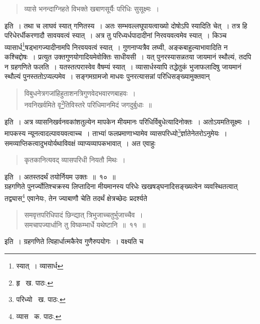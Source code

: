 \documentclass[11pt, openany]{book}
\begin{document}
\begin{quote}
{\qt व्यासे भनन्दाग्निहते विभक्ते खबाणसूर्यैः परिधिः सुसूक्ष्मः~।}
\end{quote}

\noindent इति~। तथा च लाघवं स्यात् गणितस्य~। अतः सम्भवल्लघूपायत्वाख्यो दोषोऽपि स्यादिति चेत्~। तत्र हि परिधेरर्धीकरणादौ सावयवत्वं स्यात्~। अत्र तु परिध्यर्धपादादीनां निरवयवत्वमेव स्यात्~। किञ्च व्यासार्ध\renewcommand{\thefootnote}{२}\footnote{स्यात्~। व्यासार्ध}षड्भागज्यादीनामपि निरवयवत्वं स्यात्~। गुणनाप्यत्रैव लघ्वी, अङ्कबाहुल्याभावादिति न कश्चिद्दोषः~। प्रत्युत उक्तगुणयोगादियमेवोक्तिः साधीयसी~। यत् पुनरस्यासन्नतया जायमानं स्थौल्यं, तदपि न ग्रहगणिते फलति~। यतस्तत्परास्वेव वैषम्यं स्यात्~। व्यासार्धस्यापि तद्धेतुकं भुजाफलादिषु जायमानं स्थौल्यं पुनस्ततोऽप्यल्पमेव~। सङ्गमग्रामजो माधवः पुनरत्यासन्नां परिधिसङ्ख्यामुक्तवान्\textendash 

\begin{quote}
{\qt विबुधनेत्रगजांहिहुताशनत्रिगुणवेदभवारणबाहवः~।\\
नवनिखर्वमिते वृ\renewcommand{\thefootnote}{३}\footnote{हृ \textendash\ ख. पाठः.}तिविस्तरे परिधिमानमिदं जगदुर्बुधाः~॥}
\end{quote}

\noindent इति~। अत्र व्यासनिखर्वनवकांशतुल्येन मापकेन मीयमानः परिधिर्विबुधेत्यादिनोक्तः~। अतोऽयमतिसूक्ष्मः~। मापकस्य न्यूनत्वादल्पावयवत्वाच्च~। ताभ्यां फलप्रमाणाभ्यामेव व्यासपरिध्यो\renewcommand{\thefootnote}{४}\footnote{परिध्यो \textendash\ ख. पाठः.}र्ज्ञातेनेतरोऽनुमेयः~। समव्याप्तिकत्वादुभयोर्यथाविवक्षं व्याप्यव्यापकभावात्~। अत एवाहुः\textendash 

\begin{quote}
{\qt कृतकानित्यवद् व्यासपरिधी नियतौ मिथः~।}
\end{quote}

\noindent इति~। अतस्तदर्थं तयोर्नियम उक्तः~॥~१०~॥\\

ग्रहगणिते पुनर्ज्योतिश्चक्रस्य लिप्तादिना मीयमानस्य परिधेः खखषड्घनादिसङ्ख्यत्वेन व्यवस्थितत्वात् तद्व्यास\renewcommand{\thefootnote}{५}\footnote{व्यास \textendash\ क. पाठः.} एवानेयः, तेन ज्याबाणौ चेति तदर्थं क्षेत्रच्छेदः प्रदर्श्यते\textendash 

\begin{quote}
{\ab समवृत्तपरिधिपादं छिन्द्यात् त्रिभुजाच्चतुर्भुजाच्चैव~।\\
समचापज्यार्धानि तु विष्कम्भार्धे यथेष्टानि~॥~११~॥}
\end{quote}

\newpage
इति~। ग्रहगणिते त्विहार्धात्मकैरेव गुणैरुपयोगः~। वक्ष्यति च\textendash 
\end{document}
